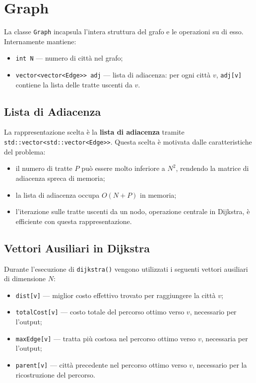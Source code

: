 \section{Graph}

La classe \texttt{Graph} incapsula l'intera struttura del grafo e 
le operazioni su di esso. Internamente mantiene:

\begin{itemize}
    \item \texttt{int N} --- numero di città nel grafo;
    \item \texttt{vector<vector<Edge>> adj} --- lista di adiacenza: 
    per ogni città $v$, \texttt{adj[v]} contiene la lista delle tratte 
    uscenti da $v$.
\end{itemize}

\subsection{Lista di Adiacenza}

La rappresentazione scelta è la \textbf{lista di adiacenza} tramite 
\texttt{std::vector<std::vector<Edge>>}. Questa scelta è motivata dalle 
caratteristiche del problema:

\begin{itemize}
    \item il numero di tratte $P$ può essere molto inferiore a $N^2$, 
    rendendo la matrice di adiacenza spreca di memoria;
    \item la lista di adiacenza occupa $O(N + P)$ in memoria;
    \item l'iterazione sulle tratte uscenti da un nodo, operazione 
    centrale in Dijkstra, è efficiente con questa rappresentazione.
\end{itemize}

\subsection{Vettori Ausiliari in Dijkstra}

Durante l'esecuzione di \texttt{dijkstra()} vengono utilizzati i 
seguenti vettori ausiliari di dimensione $N$:

\begin{itemize}
    \item \texttt{dist[v]} --- miglior costo effettivo trovato per 
    raggiungere la città $v$;
    \item \texttt{totalCost[v]} --- costo totale del percorso ottimo 
    verso $v$, necessario per l'output;
    \item \texttt{maxEdge[v]} --- tratta più costosa nel percorso ottimo 
    verso $v$, necessaria per l'output;
    \item \texttt{parent[v]} --- città precedente nel percorso ottimo 
    verso $v$, necessario per la ricostruzione del percorso.
\end{itemize}
